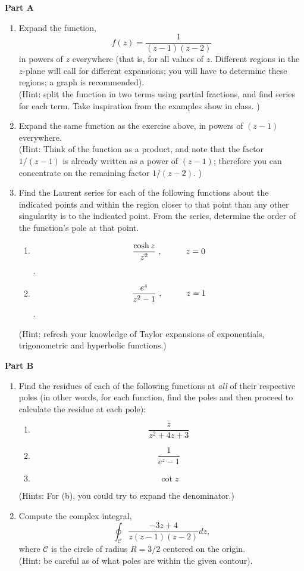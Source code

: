 \documentclass[fleqn]{article}
\begin{document}
  \textbf{Part A}
  \begin{enumerate}

    \item Expand the function,
    $$
    f(z) = \frac{1 }{(z - 1) (z - 2)}
    $$
    in powers of $z$ everywhere (that is, for all values of $z$. Different regions in the $z$-plane will call for different expansions; you will have to determine these regions; a graph is recommended). \\
    (Hint: split the function in two terms using partial fractions, and find series for each term. Take inspiration from the examples show in class. )
    
    \item Expand the same function as the exercise above, in powers of $(z - 1)$ everywhere.\\
     (Hint: Think of the function as a product, and note that the factor $1/(z-1)$ is already written as a power of $(z-1)$; therefore you can concentrate on the remaining factor $1/(z-2)$. )
    
    \item Find the Laurent series for each of the following functions about the indicated points and within the region closer to that point than any other singularity is to the indicated point. From the series, determine the order of the function's pole at that point.
    \begin{enumerate}
      \item $$\frac{\cosh z}{z^2}~, \hskip 1truecm z=0$$ . 
      \item $$\frac{e^z}{z^2-1}~, \hskip 1truecm z=1$$.    
    \end{enumerate}
    (Hint: refresh your knowledge of Taylor expansions of exponentials, trigonometric and hyperbolic functions.)
    
  \end{enumerate}

  \pagebreak

  \textbf{Part B}
  \begin{enumerate}

    \item Find the residues of each of the following functions at \emph{all} of their respective poles (in other words, for each function, find the poles and then proceed to calculate the residue at each pole):
    \begin{enumerate}
      \item $$\frac{z}{z^2 + 4z + 3}$$
      
      \item $$\frac{1}{e^z - 1}$$
      
      \item $$\cot z$$
    \end{enumerate}
    (Hints:  For (b), you could try to expand the denominator.) 
    
    
    \item Compute the complex integral,
    $$ \oint_{\mathcal C} \frac{-3z + 4}{z(z-1)(z-2)} dz ,$$
    where ${\mathcal C}$ is the circle of radius $R=3/2$ centered on the origin. \\
    (Hint:  be careful as of what poles are within the given contour). 
    
  \end{enumerate}
\end{document}

